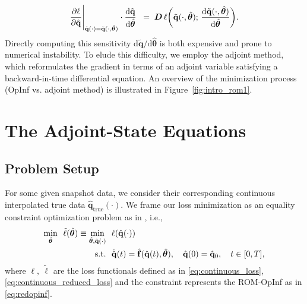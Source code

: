 $$\frac{\partial \ell}{\partial \hat{\mathbf{q}}}\Bigg\vert_{\hat{\mathbf{q}}(\cdot)=\tilde{\mathbf{q}}(\cdot, \hat{\bm{\theta}})}
    \cdot\frac{\mathrm{d}\tilde{\mathbf{q}}}{\mathrm{d}\hat{\bm{\theta}}}
  \;
  \;=\;
  \bm{D}\,\ell\biggl(\tilde{\mathbf{q}}(\cdot,\hat{\bm{\theta}});\,
    \dv{\tilde{\mathbf{q}}(\cdot,\hat{\bm{\theta}})}{\hat{\bm{\theta}}}
  \biggr).$$
Directly computing this sensitivity $\mathrm{d} \tilde{\mathbf{q}}/\mathrm{d} \hat{\bm{\theta}}$ is both expensive and prone to numerical instability.  To elude this difficulty, we employ the adjoint method, which reformulates the gradient in terms of an adjoint variable satisfying a backward-in-time differential equation. An overview of the minimization process (OpInf vs. adjoint method) is illustrated in Figure~\ref{fig:intro_rom1}.





\newpage

\section{The Adjoint-State Equations}
\label{sec:adjoint_eqs}

\subsection*{Problem Setup}

For some given snapshot data, we consider their corresponding continuous interpolated true data $\hat{\mathbf{q}}_{\text{true}}(\cdot)$. We frame our loss minimization as an equality constraint optimization problem as in \cite{bradley2024pde}, i.e.,\\
\begin{align}
    \underset{\hat{\bm{\theta}}}{\mathrm{min}}~~\tilde\ell (\hat{\bm{\theta}})\equiv\underset{\hat{\bm{\theta}},\hat{\mathbf{q}}(\cdot)}{\mathrm{min}} ~~&\ell (\hat{\mathbf{q}}(\cdot))\notag\\
    \mathrm{s.t.}~~&\dot{\hat{\mathbf{q}}}(t) = \hat{\mathbf{f}}(\hat{\mathbf{q}}(t),\hat{\bm{\theta}}), \quad\hat{\mathbf{q}}(0)=\hat{\mathbf{q}}_0, \quad t\in[0,T],
    \label{eq:opt_problem}
\end{align}
where $\ell,~\tilde{\ell}$ are the loss functionals defined as in \eqref{eq:continuous_loss}, \eqref{eq:continuous_reduced_loss} and the constraint represents the ROM-OpInf as in \eqref{eq:redopinf}.

